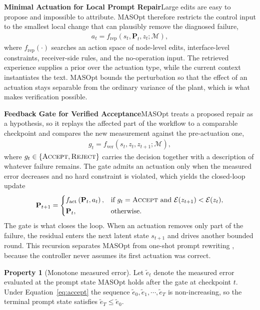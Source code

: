 \documentclass{article}
\theoremstyle{definition}
\newtheorem{property}{Property}
\begin{document}
\textbf{Minimal Actuation for Local Prompt Repair}\quad Large edits are easy to propose and impossible to attribute. MASOpt therefore restricts the control input to the smallest local change that can plausibly remove the diagnosed failure,
\begin{gather}
    a_t = f_{\mathrm{rep}}\left( s_t, \mathbf{P}_t, z_t; \mathcal{M} \right), \label{eq:repair}
\end{gather}
where $f_{\mathrm{rep}}(\cdot)$ searches an action space of node-level edits, interface-level constraints, receiver-side rules, and the no-operation input. The retrieved experience supplies a prior over the actuation type, while the current context instantiates the text. MASOpt bounds the perturbation so that the effect of an actuation stays separable from the ordinary variance of the plant, which is what makes verification possible.

\textbf{Feedback Gate for Verified Acceptance}\quad MASOpt treats a proposed repair as a hypothesis, so it replays the affected part of the workflow to a comparable checkpoint and compares the new measurement against the pre-actuation one,
\begin{gather}
    g_t = f_{\mathrm{ver}}\left( s_t, z_t, z_{t+1}; \mathcal{M} \right), \label{eq:verify}
\end{gather}
where $g_t \in \{\textsc{Accept}, \textsc{Reject}\}$ carries the decision together with a description of whatever failure remains. The gate admits an actuation only when the measured error decreases and no hard constraint is violated, which yields the closed-loop update
\begin{gather}
    \mathbf{P}_{t+1} =
    \begin{cases}
        f_{\mathrm{act}}\left( \mathbf{P}_t, a_t \right), & \text{if } g_t = \textsc{Accept} \text{ and } \mathcal{E}(z_{t+1}) < \mathcal{E}(z_{t}), \\[2pt]
        \mathbf{P}_t, & \text{otherwise}.
    \end{cases}
    \label{eq:accept}
\end{gather}
The gate is what closes the loop. When an actuation removes only part of the failure, the residual enters the next latent state $s_{t+1}$ and drives another bounded round. This recursion separates MASOpt from one-shot prompt rewriting \citep{madaan2023selfrefine}, because the controller never assumes its first actuation was correct.

\begin{property}[Monotone measured error]
\label{prop:monotone}
Let $\tilde{e}_t$ denote the measured error evaluated at the prompt state MASOpt holds after the gate at checkpoint $t$. Under Equation~\ref{eq:accept} the sequence $\tilde{e}_0, \tilde{e}_1, \cdots, \tilde{e}_T$ is non-increasing, so the terminal prompt state satisfies $\tilde{e}_T \leq \tilde{e}_0$.
\end{property}
\end{document}
